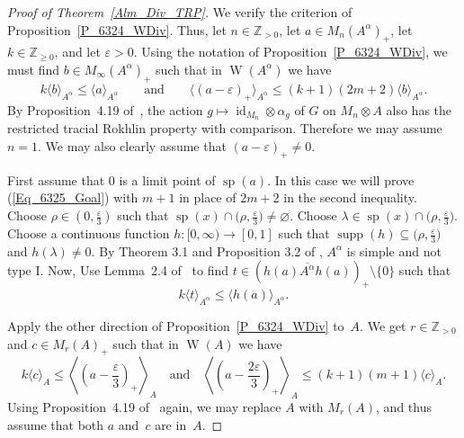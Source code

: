 \documentclass[10pt]{amsart}
\numberwithin{equation}{section}
\theoremstyle{definition}
\newcommand{\af}{\alpha}
\newcommand{\ep}{\varepsilon}
\newcommand{\ld}{\lambda}
\newcommand{\rh}{\rho}
\newcommand{\N}{{\mathbb{Z}}_{> 0}}
\newcommand{\Nz}{{\mathbb{Z}}_{\geq 0}}
\newcommand{\id}{{\operatorname{id}}}
\newcommand{\spec}{{\operatorname{sp}}}
\newcommand{\supp}{{\operatorname{supp}}}
\newcommand{\W}{{\operatorname{W}}}
\newcommand{\andeqn}{\qquad {\mbox{and}} \qquad}
\newcommand{\cfn}{continuous function}
\renewcommand{\S}{\subseteq}
\newcommand{\ov}{\overline}
\newcommand{\SM}{\setminus}
\newcommand{\I}{\infty}
\newcommand{\E}{\varnothing}
\newcommand{\cc}[1]{\langle #1 \rangle}
\newcommand{\inn}[1]{\left\langle #1 \right\rangle}
\begin{document}
\begin{proof}[Proof of Theorem~\ref{Alm_Div_TRP}]
We verify the criterion of Proposition~\ref{P_6324_WDiv}.
Thus, let $n \in \N$, let $a \in M_{n} (A^{\af})_+$,
let $k \in \Nz$, and let $\ep > 0$.
Using the notation of Proposition~\ref{P_6324_WDiv}, we must find
$b \in M_{\I} (A^{\alpha})_+$
such that in $\W (A^{\alpha})$ we have
%
\begin{equation}\label{Eq_6325_Goal}
k \cc{b}_{A^{\alpha}} \leq \cc{a}_{A^{\alpha}}
\andeqn
\cc{(a - \ep)_+}_{A^{\alpha}} \leq (k + 1) (2 m + 2) \cc{b}_{A^{\alpha}}.
\end{equation}
%
By Proposition~4.19 of~\cite{MohPhil2021TRP},
the action $g \mapsto \id_{M_n} \otimes \af_g$ of $G$ on $M_{n} \otimes A$
also has the restricted tracial Rokhlin property with comparison.
Therefore we may assume $n = 1$.
We may also clearly assume that $(a - \ep)_+ \neq 0$.

First assume that $0$ is a limit point of $\spec (a)$.
In this case we will prove (\ref{Eq_6325_Goal}) with $m + 1$
in place of $2 m + 2$ in the second inequality.
Choose  $\rh \in (0, \frac{\ep}{3})$ such that
$\spec (x) \cap \bigl( \rh, \frac{\ep}{3} \bigr) \neq \E$.
Choose $\ld \in \spec (x) \cap \bigl( \rh, \frac{\ep}{3} \bigr)$.
Choose a \cfn{} $h \colon [0, \I) \to [0, 1]$ such that
$\supp (h) \S \bigl( \rh, \frac{\ep}{3} \bigr)$ and $h (\ld) \neq 0$. By Theorem 3.1 and Proposition 3.2 of \cite{MohPhil2021TRP}, $A^{\alpha}$ is simple and not type I. Now, Use Lemma~2.4 of~\cite{Phl40} to find $t \in ({\ov{h (a) A^{\af} h (a)}})_{+} \SM \{ 0 \}$ such that
%
\begin{equation}\label{Eq_6325_t}
k \cc{t}_{A^{\af}} \leq \cc{h (a)}_{A^{\af}}.
\end{equation}
%

Apply the other direction of Proposition~\ref{P_6324_WDiv} to~$A$.
We get $r \in \N$ and $c \in M_r (A)_{+}$ such that
in $\W (A)$ we have
%
\begin{equation}\label{Eq_6324_c}
k \cc{c}_{A} \leq \inn{ \left( a - \frac{\ep}{3} \right)_+}_{A}
\quad {\mbox{and}} \quad
\inn{\left( a - \frac{2 \ep}{3} \right)_+}_{A}
 \leq (k + 1) (m + 1) \cc{c}_{A}.
\end{equation}
%
Using Proposition~4.19 of~\cite{MohPhil2021TRP} again,
we may replace $A$ with $M_r (A)$,
and thus assume that both $a$ and~$c$ are in~$A$.


\end{proof}
\end{document}
